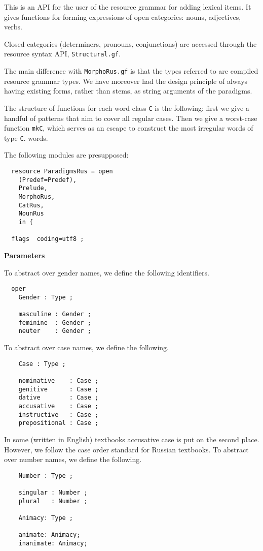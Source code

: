 This is an API for the user of the resource grammar for adding
lexical items. It gives functions for forming expressions of open
categories: nouns, adjectives, verbs.

Closed categories (determiners, pronouns, conjunctions) are
accessed through the resource syntax API, {\tt Structural.gf}.

The main difference with {\tt MorphoRus.gf} is that the types
referred to are compiled resource grammar types. We have moreover
had the design principle of always having existing forms, rather
than stems, as string arguments of the paradigms.

The structure of functions for each word class {\tt C} is the following:
first we give a handful of patterns that aim to cover all
regular cases. Then we give a worst-case function {\tt mkC}, which serves as an
escape to construct the most irregular words of type {\tt C}.
words.

The following modules are presupposed:
\begin{verbatim}
  resource ParadigmsRus = open
    (Predef=Predef),
    Prelude,
    MorphoRus,
    CatRus,
    NounRus
    in {

  flags  coding=utf8 ;
\end{verbatim}

\textbf{Parameters}

To abstract over gender names, we define the following identifiers.
\begin{verbatim}
  oper
    Gender : Type ;

    masculine : Gender ;
    feminine  : Gender ;
    neuter    : Gender ;
\end{verbatim}

To abstract over case names, we define the following.
\begin{verbatim}
    Case : Type ;

    nominative    : Case ;
    genitive      : Case ;
    dative        : Case ;
    accusative    : Case ;
    instructive   : Case ;
    prepositional : Case ;
\end{verbatim}

In some (written in English) textbooks accusative case
is put on the second place. However, we follow the case order
standard for Russian textbooks.
To abstract over number names, we define the following.
\begin{verbatim}
    Number : Type ;

    singular : Number ;
    plural   : Number ;

    Animacy: Type ;

    animate: Animacy;
    inanimate: Animacy;
\end{verbatim}

